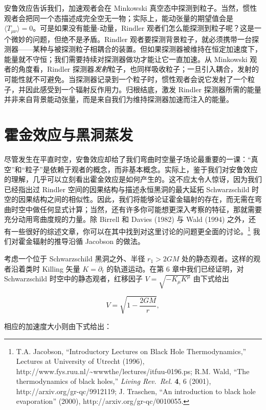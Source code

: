 安鲁效应告诉我们，加速观者会在 Minkowski 真空态中探测到粒子。当然，惯性观者会把同一个态描述成完全空无一物；实际上，能动张量的期望值会是 $\langle T_{\mu\nu}\rangle=0$。可是如果没有能量-动量，Rindler 观者们怎么能探测到粒子呢？这是一个微妙的问题，但绝不是矛盾。Rindler 观者要探测背景粒子，就必须携带一台探测器——某种与被探测粒子相耦合的装置。但如果探测器被维持在恒定加速度下，能量就不守恒；我们需要持续对探测器做功才能让它一直加速。从 Minkowski 观者的角度看，Rindler 探测器\emph{发射}粒子，也同样吸收粒子；一旦引入耦合，发射的可能性就不可避免。当探测器记录到一个粒子时，惯性观者会说它发射了一个粒子，并因此感受到一个辐射反作用力。归根结底，激发 Rindler 探测器所需的能量并非来自背景能动张量，而是来自我们为维持探测器加速而注入的能量。

\section{霍金效应与黑洞蒸发}

尽管发生在平直时空，安鲁效应却给了我们弯曲时空量子场论最重要的一课：“真空”和“粒子”是依赖于观者的概念，而非基本概念。实际上，鉴于我们对安鲁效应的理解，几乎可以立刻看出霍金效应是如何产生的。这不应太令人惊讶，因为我们已经指出过 Rindler 空间的因果结构与描述永恒黑洞的最大延拓 Schwarzschild 时空的因果结构之间的相似性。因此，我们将能够论证霍金辐射的存在，而无需在弯曲时空中做任何显式计算；当然，还有许多你可能想更深入考察的特征，那就需要充分动用弯曲度规的力量。除 Birrell 和 Davies (1982) 与 Wald (1994) 之外，还有一些很好的综述文章，你可以在其中找到对这里讨论的问题更全面的讨论。\footnote{T.A. Jacobson, “Introductory Lectures on Black Hole Thermodynamics,” Lectures at University of Utrecht (1996), http://www.fys.ruu.nl/\textasciitilde{}wwwthe/lectures/itfuu-0196.ps; R.M. Wald, “The thermodynamics of black holes,” \emph{Living Rev.\ Rel.} \textbf{4}, 6 (2001), http://arxiv.org/gr-qc/9912119; J. Traschen, “An introduction to black hole evaporation” (2000), http://arxiv.org/gr-qc/0010055.} 我们对霍金辐射的推导沿循 Jacobson 的做法。

考虑一个位于 Schwarzschild 黑洞之外、半径 $r_{1} > 2GM$ 处的静态观者。这样的观者沿着类时 Killing 矢量 $K = \partial_{t}$ 的轨道运动。在第 6 章中我们已经证明，对 Schwarzschild 时空中的静态观者，红移因子 $V = \sqrt{-K_{\mu}K^{\mu}}$ 由下式给出

\begin{equation*}
V = \sqrt{1 - \frac{2GM}{r}},
\tag{9.169}
\end{equation*}

相应的加速度大小则由下式给出：

